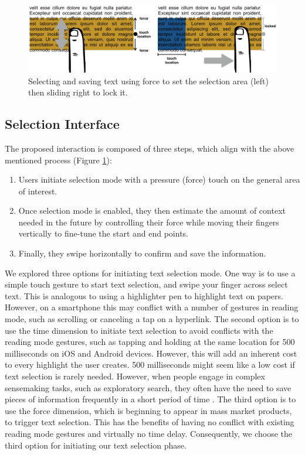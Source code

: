 \begin{figure}
    \centering
    \includegraphics[width=0.8\columnwidth]{Chapters/Highlight/img/system2}
    \caption[Proposed interaction for selecting and saving text on force sensitive touch screens.]{Selecting and saving text using force to set the selection area (left) then sliding right to lock it.}
    \label{fig:system}
\end{figure}


\subsection{Selection Interface}

The proposed interaction is composed of three steps, which align with the above mentioned process (Figure \ref{fig:system}): 
\begin{enumerate}
    \item Users initiate selection mode with a pressure (force) touch on the general area of interest. 
    \item Once selection mode is enabled, they then estimate the amount of context needed in the future by controlling their force while moving their fingers vertically to fine-tune the start and end points. 
    \item Finally, they swipe horizontally to confirm and save the information.
\end{enumerate}

We explored three options for initiating text selection mode. One way is to use a simple touch gesture to start text selection, and swipe your finger across select text. This is analogous to using a highlighter pen to highlight text on papers. However, on a smartphone this may conflict with a number of gestures in reading mode, such as scrolling or canceling a tap on a hyperlink. The second option is to use the time dimension to initiate text selection to avoid conflicts with the reading mode gestures, such as tapping and holding at the same location for 500 milliseconds on iOS and Android devices. However, this will add an inherent cost to every highlight the user creates. 500 milliseconds might seem like a low cost if text selection is rarely needed. However, when people engage in complex sensemaking tasks, such as exploratory search, they often have the need to save pieces of information frequently in a short period of time \cite{teevan2006personal}. The third option is to use the force dimension, which is beginning to appear in mass market products, to trigger text selection. This has the benefits of having no conflict with existing reading mode gestures and virtually no time delay. Consequently, we choose the third option for initiating our text selection phase.

